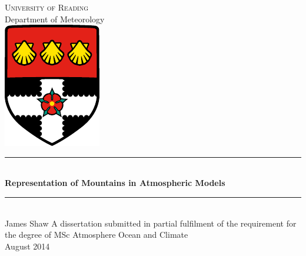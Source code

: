 \begin{titlepage}
\begin{center}
\textsc{\Large University of Reading} \\[12pt]
{\Large Department of Meteorology} \\[16pt]
\includegraphics{uor-logo} \\[48pt]

\rule{\textwidth}{.4pt} \\[12pt]
{ \huge \bfseries Representation of Mountains in Atmospheric Models \\[12pt] } \rule{\textwidth}{.4pt} \\[54pt]
{\LARGE James Shaw}
\vfill
A dissertation submitted in partial fulfilment of the requirement for the degree of MSc Atmosphere Ocean and Climate \\[48pt]
{\Large August 2014}
\end{center}
\end{titlepage}
